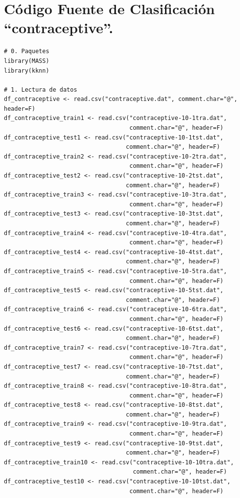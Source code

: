 \documentclass[a4paper,12pt, oneside]{book}
\begin{document}
\chapter{Código Fuente de Clasificación ``contraceptive''.}
\begin{verbatim}
# 0. Paquetes
library(MASS)
library(kknn)

# 1. Lectura de datos
df_contraceptive <- read.csv("contraceptive.dat", comment.char="@", header=F)
df_contraceptive_train1 <- read.csv("contraceptive-10-1tra.dat", 
	                                comment.char="@", header=F)
df_contraceptive_test1 <- read.csv("contraceptive-10-1tst.dat", 
	                               comment.char="@", header=F)
df_contraceptive_train2 <- read.csv("contraceptive-10-2tra.dat", 
	                                comment.char="@", header=F)
df_contraceptive_test2 <- read.csv("contraceptive-10-2tst.dat", 
	                               comment.char="@", header=F)
df_contraceptive_train3 <- read.csv("contraceptive-10-3tra.dat", 
	                                comment.char="@", header=F)
df_contraceptive_test3 <- read.csv("contraceptive-10-3tst.dat", 
	                               comment.char="@", header=F)
df_contraceptive_train4 <- read.csv("contraceptive-10-4tra.dat", 
	                                comment.char="@", header=F)
df_contraceptive_test4 <- read.csv("contraceptive-10-4tst.dat", 
	                               comment.char="@", header=F)
df_contraceptive_train5 <- read.csv("contraceptive-10-5tra.dat",
                                    comment.char="@", header=F)
df_contraceptive_test5 <- read.csv("contraceptive-10-5tst.dat", 
	                               comment.char="@", header=F)
df_contraceptive_train6 <- read.csv("contraceptive-10-6tra.dat",
                                    comment.char="@", header=F)
df_contraceptive_test6 <- read.csv("contraceptive-10-6tst.dat", 
	                               comment.char="@", header=F)
df_contraceptive_train7 <- read.csv("contraceptive-10-7tra.dat", 
	                                comment.char="@", header=F)
df_contraceptive_test7 <- read.csv("contraceptive-10-7tst.dat", 
	                               comment.char="@", header=F)
df_contraceptive_train8 <- read.csv("contraceptive-10-8tra.dat", 
	                                comment.char="@", header=F)
df_contraceptive_test8 <- read.csv("contraceptive-10-8tst.dat", 
	                               comment.char="@", header=F)
df_contraceptive_train9 <- read.csv("contraceptive-10-9tra.dat",
                                    comment.char="@", header=F)
df_contraceptive_test9 <- read.csv("contraceptive-10-9tst.dat", 
	                               comment.char="@", header=F)
df_contraceptive_train10 <- read.csv("contraceptive-10-10tra.dat", 
	                                 comment.char="@", header=F)
df_contraceptive_test10 <- read.csv("contraceptive-10-10tst.dat", 
	                                comment.char="@", header=F)


\end{verbatim}
\end{document}
